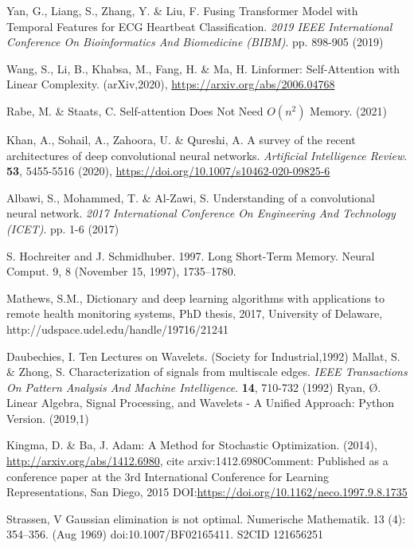 \documentclass{ieeeaccess}
\begin{document}
\begin{thebibliography}{1}
Yan, G., Liang, S., Zhang, Y. \& Liu, F. Fusing Transformer Model with Temporal Features for ECG Heartbeat Classification. {\em 2019 IEEE International Conference On Bioinformatics And Biomedicine (BIBM)}. pp. 898-905 (2019)

Wang, S., Li, B., Khabsa, M., Fang, H. \& Ma, H. Linformer: Self-Attention with Linear Complexity. (arXiv,2020), \url{https://arxiv.org/abs/2006.04768}

Rabe, M. \& Staats, C. Self-attention Does Not Need $O(n^2)$ Memory.  (2021)

Khan, A., Sohail, A., Zahoora, U. \& Qureshi, A. A survey of the recent architectures of deep convolutional neural networks. {\em Artificial Intelligence Review}. \textbf{53}, 5455-5516 (2020), \url{https://doi.org/10.1007/s10462-020-09825-6}


Albawi, S., Mohammed, T. \& Al-Zawi, S. Understanding of a convolutional neural network. {\em 2017 International Conference On Engineering And Technology (ICET)}. pp. 1-6 (2017)

S. Hochreiter and J. Schmidhuber. 1997. Long Short-Term Memory. Neural Comput. 9, 8 (November 15, 1997), 1735–1780.

Mathews, S.M., Dictionary and deep learning algorithms with applications to remote health monitoring systems, PhD thesis, 2017, University of Delaware, http://udspace.udel.edu/handle/19716/21241


Daubechies, I. Ten Lectures on Wavelets. (Society for Industrial,1992)
Mallat, S. \& Zhong, S. Characterization of signals from multiscale edges. {\em IEEE Transactions On Pattern Analysis And Machine Intelligence}. \textbf{14}, 710-732 (1992)
Ryan, Ø. Linear Algebra, Signal Processing, and Wavelets - A Unified Approach: Python Version.  (2019,1)

Kingma, D. \& Ba, J. Adam: A Method for Stochastic Optimization.  (2014), \url{http://arxiv.org/abs/1412.6980}, cite arxiv:1412.6980Comment: Published as a conference paper at the 3rd International Conference for Learning Representations, San Diego, 2015
 DOI:\url{https://doi.org/10.1162/neco.1997.9.8.1735}

Strassen, V Gaussian elimination is not optimal. Numerische Mathematik. 13 (4): 354–356. (Aug 1969) doi:10.1007/BF02165411. S2CID 121656251


\end{thebibliography}
\end{document}
